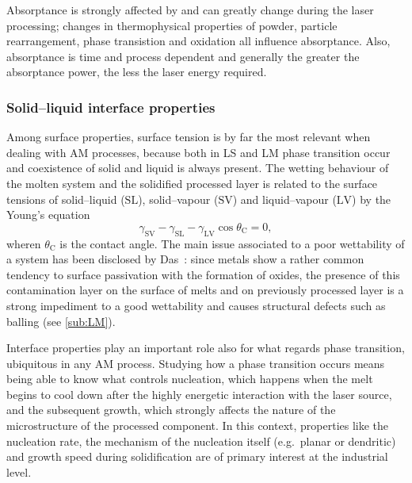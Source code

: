 Absorptance is strongly affected by and can greatly change during the laser processing; changes in thermophysical properties of powder, particle rearrangement, phase transistion and oxidation all influence absorptance. Also, absorptance is time and process dependent and generally the greater the absorptance power, the less the laser energy required.


\subsubsection{Solid--liquid interface properties}
Among surface properties, surface tension is by far the most relevant  when dealing with AM processes, because both in LS and LM phase transition occur and coexistence of solid and liquid is always present. The wetting behaviour of the molten system and the solidified processed layer is related to the surface tensions of solid--liquid ($\mathrm{SL}$), solid--vapour ($\mathrm{SV}$) and liquid--vapour ($\mathrm{LV}$) by the Young's equation
\begin{equation}
    \gamma_\mathrm{SV} - \gamma_\mathrm{SL} - \gamma_\mathrm{LV} \cos \theta_\mathrm{C}=0,
\end{equation}
wheren $\theta_\mathrm{C}$ is the contact angle. The main issue associated to a poor wettability of a system has been disclosed by Das~\cite{Das2003}: since metals show a rather common tendency to surface passivation with the formation of oxides, the presence of this contamination layer on the surface of melts and on previously processed layer is a strong impediment to a good wettability and causes structural defects such as balling (see \cref{sub:LM}). %

Interface properties play an important role also for what regards phase transition, ubiquitous in any AM process. Studying how a phase transition occurs means being able to know what controls nucleation, which happens when the melt begins to cool down after the highly energetic interaction with the laser source, and the subsequent growth, which strongly affects the nature of the microstructure of the processed component.
In this context, properties like the nucleation rate, the mechanism of the nucleation itself (e.g.\ planar or dendritic) and growth speed during solidification are of primary interest at the industrial level. 







